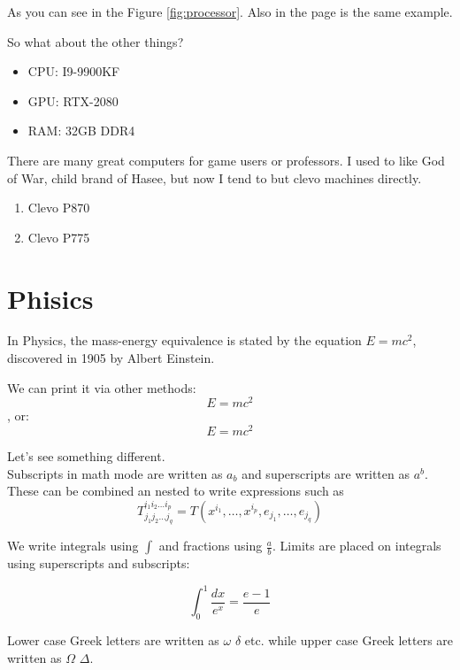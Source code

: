 \documentclass[12pt, letterpaper, twoside]{article}
\begin{document}
As you can see in the Figure \ref{fig:processor}. Also in the page \pageref{fig:processor} is the same example.


So what about the other things?
\begin{itemize}
	\item CPU: I9-9900KF
	\item GPU: RTX-2080
	\item RAM: 32GB DDR4
\end{itemize}


There are many great computers for game users or professors. I used to like God of War, child brand of Hasee, but now I tend to but clevo machines directly.
\begin{enumerate}
	\item Clevo P870
	\item Clevo P775
\end{enumerate}



\section{Phisics}


In Physics, the mass-energy equivalence is stated by the equation $E=mc^2$, discovered in 1905 by Albert Einstein.

We can print it via other methods:
\[ E=mc^2 \], or:
\begin{equation}
E=mc^2
\end{equation}


Let's see something different.\\
Subscripts in math mode are written as $a_b$ and superscripts are written as $a^b$. These can be combined an nested to write expressions such as 
\begin{equation}
T^{i_1 i_2 \dots i_p}_{j_1 j_2 \dots j_q} = T(x^{i_1}, \dots, x^{i_p}, e_{j_1}, \dots, e_{j_q})
\end{equation}

We write integrals using $\int$ and fractions using $\frac{a}{b}$. Limits are placed on integrals using superscripts and  subscripts:

\begin{equation}
\int_0^1 \frac{dx}{e^x}=\frac{e-1}{e}
\end{equation}

Lower case Greek letters are written as $\omega$ $\delta$ etc. while upper case Greek letters are written as $\Omega$ $\Delta$.
\end{document}
